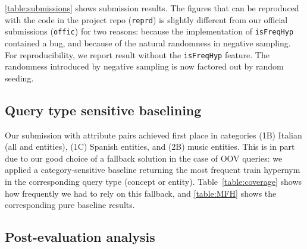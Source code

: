 \documentclass[11pt,a4paper]{article}
\begin{document}
\autoref{table:submissions} shows submission results.
The figures that can be reproduced with the code in the project repo
(\texttt{reprd}) is slightly different from our official submissions
(\texttt{offic}) for two reasons:
because the implementation of \texttt{isFreqHyp} contained a bug, and because
of the natural randomness in negative sampling.
For reproducibility, we report result without the \texttt{isFreqHyp} feature.
The randomness introduced by negative sampling is now factored out by random
seeding.






\subsection{Query type sensitive baselining}

Our submission with attribute pairs achieved first place in 
categories
  {(1B) Italian} ({all} and {entities}),
  {(1C) Spanish entities}, and
  {(2B) music entities}.
This is in part due to our good choice of a fallback solution
in the case of OOV queries: we applied a category-sensitive baseline returning
the most frequent train hypernym in the corresponding query type (concept or
entity).  Table~\ref{table:coverage} shows how frequently we had to rely on
this fallback, and \autoref{table:MFH} shows the corresponding pure baseline
results.



\subsection{Post-evaluation analysis}
\end{document}
